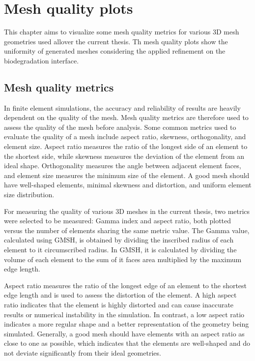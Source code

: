 \chapter{Mesh quality plots}\label{ch:appendix}

This chapter aims to visualize some mesh quality metrics for various 3D mesh geometries used allover the current thesis. Th mesh quality plots show the uniformity of generated meshes considering the applied refinement on the biodegradation interface.

\section{Mesh quality metrics}

In finite element simulations, the accuracy and reliability of results are heavily dependent on the quality of the mesh. Mesh quality metrics are therefore used to assess the quality of the mesh before analysis. Some common metrics used to evaluate the quality of a mesh include aspect ratio, skewness, orthogonality, and element size. Aspect ratio measures the ratio of the longest side of an element to the shortest side, while skewness measures the deviation of the element from an ideal shape. Orthogonality measures the angle between adjacent element faces, and element size measures the minimum size of the element. A good mesh should have well-shaped elements, minimal skewness and distortion, and uniform element size distribution.

For measuring the quality of various 3D meshes in the current thesis, two metrics were selected to be measured: Gamma index and aspect ratio, both plotted versus the number of elements sharing the same metric value. The Gamma value, calculated using GMSH, is obtained by dividing the inscribed radius of each element to it circumscribed radius. In GMSH, it is calculated by dividing the volume of each element to the sum of it faces area multiplied by the maximum edge length. 

Aspect ratio measures the ratio of the longest edge of an element to the shortest edge length and is used to assess the distortion of the element. A high aspect ratio indicates that the element is highly distorted and can cause inaccurate results or numerical instability in the simulation. In contrast, a low aspect ratio indicates a more regular shape and a better representation of the geometry being simulated. Generally, a good mesh should have elements with an aspect ratio as close to one as possible, which indicates that the elements are well-shaped and do not deviate significantly from their ideal geometries. 

